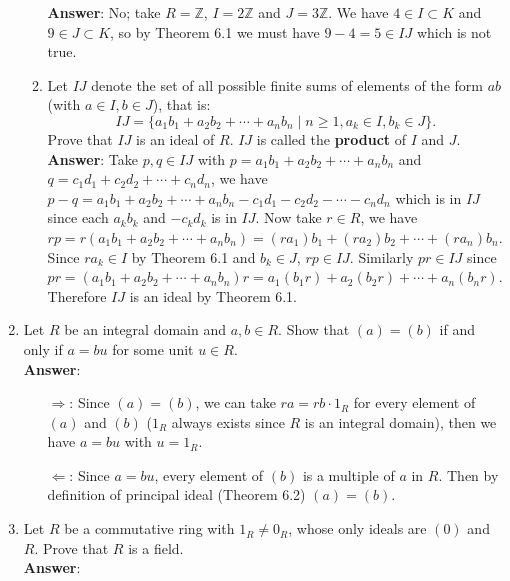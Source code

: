 \documentclass{article}
\begin{document}
\begin{enumerate}
\begin{enumerate}
                        \textbf{Answer}: No; take $R=\mathbb{Z}$, $I=2\mathbb{Z}$ and $J=3\mathbb{Z}$. We have $4\in I\subset K$ and $9\in J\subset K$, so by Theorem 6.1 we must have $9-4=5\in IJ$ which is not true.
                  \item Let $IJ$ denote the set of all possible finite sums of elements of the form $ab$ (with $a\in I, b\in J$), that is: \[IJ=\{a_1b_1+a_2b_2+\cdots+a_nb_n\mid n\geq 1, a_k\in I, b_k\in J\}.\] Prove that $IJ$ is an ideal of $R$. $IJ$ is called the \textbf{product} of $I$ and $J$.\\
                        \textbf{Answer}: Take $p,q\in IJ$ with $p=a_1b_1+a_2b_2+\cdots+a_nb_n$ and $q=c_1d_1+c_2d_2+\cdots+c_nd_n$, we have $p-q=a_1b_1+a_2b_2+\cdots+a_nb_n-c_1d_1-c_2d_2-\cdots-c_nd_n$ which is in $IJ$ since each $a_kb_k$ and $-c_kd_k$ is in $IJ$. Now take $r\in R$, we have $rp=r(a_1b_1+a_2b_2+\cdots+a_nb_n)=(ra_1)b_1+(ra_2)b_2+\cdots+(ra_n)b_n$. Since $ra_k\in I$ by Theorem 6.1 and $b_k\in J$, $rp\in IJ$. Similarly $pr\in IJ$ since $pr=(a_1b_1+a_2b_2+\cdots+a_nb_n)r=a_1(b_1r)+a_2(b_2r)+\cdots+a_n(b_nr)$. Therefore $IJ$ is an ideal by Theorem 6.1.
            \end{enumerate}
      \item Let $R$ be an integral domain and $a,b\in R$. Show that $(a)=(b)$ if and only if $a=bu$ for some unit $u\in R$.\\
            \textbf{Answer}:
            \begin{itemize}
                  \item [$\Rightarrow$:] Since $(a)=(b)$, we can take $ra=rb\cdot 1_R$ for every element of $(a)$ and $(b)$ ($1_R$ always exists since $R$ is an integral domain), then we have $a=bu$ with $u=1_R$.
                  \item [$\Leftarrow$:] Since $a=bu$, every element of $(b)$ is a multiple of $a$ in $R$. Then by definition of principal ideal (Theorem 6.2) $(a)=(b)$.
            \end{itemize}
      \item Let $R$ be a commutative ring with $1_R\neq 0_R$, whose only ideals are $(0)$ and $R$. Prove that $R$ is a field.\\
            \textbf{Answer}:
\end{enumerate}
\end{document}
